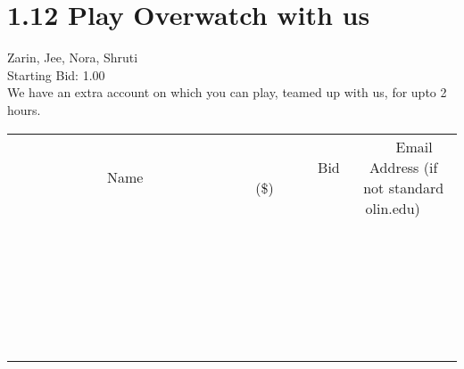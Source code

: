 \documentclass[11pt]{article}
\begin{document}
					\section*{1.12 Play Overwatch with us}
					Zarin, Jee, Nora, Shruti \\
					Starting Bid: 1.00 \\
					We have an extra account on which you can play, teamed up with us, for upto 2 hours. \\
					[6ex]
					\begin{tabular}{c c c}
						~~~~~~~~~~~~~Name~~~~~~~~~~~~~ & ~~~~~~~~~Bid (\$)~~~~~~~~~ & ~~~Email Address (if not standard olin.edu)~~~ \\
				
 & & \\
\hline
 & & \\
\hline
 & & \\
\hline
 & & \\
\hline
 & & \\
\hline
 & & \\
\hline
 & & \\
\hline
 & & \\
\hline
 & & \\
\hline
 & & \\
\hline
 & & \\
\hline
 & & \\
\hline
 & & \\
\hline
 & & \\
\hline
 & & \\
\hline
 & & \\
\hline
 & & \\
\hline
 & & \\
\hline
 & & \\
\hline
 & & \\
\hline
 & & \\
\hline
 & & \\
\hline
 & & \\
\hline
 & & \\
\hline
 & & \\
\hline
 & & \\
\hline
					\end{tabular}
					\clearpage
				
\end{document}
